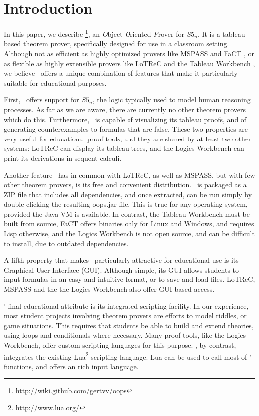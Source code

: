 \section{Introduction}
\label{sec:introduction}

In this paper, we describe \oops\footnote{http://wiki.github.com/gertvv/oops},
an {\it O}bject {\it O}riented {\it P}rover for $S5_n$.
It is a tableau-based theorem prover, specifically designed for use in a
classroom setting.
Although not as efficient as highly optimized provers like MSPASS
\citep{mspass2000} and FaCT \citep{fact1998}, or as flexible as highly
extensible provers like LoTReC \citep{lotrec2005} and the Tableau Workbench
\citep{twb2009}, we believe \oops\ offers a unique combination of features
that make it particularly suitable for educational purposes.

First, \oops\ offers support for $S5_n$, the logic typically used to model
human reasoning processes.
As far as we are aware, there are currently no other theorem provers which do
this.
Furthermore, \oops\ is capable of visualizing its tableau proofs, and of
generating counterexamples to formulas that are false.
These two properties are very useful for educational proof tools, and they are
shared by at least two other systems: LoTReC can display its tableau trees,
and the Logics Workbench \citep{heuerding1996} can print its derivations in
sequent calculi.

Another feature \oops\ has in common with LoTReC, as well as MSPASS, but with
few other theorem provers, is its free and convenient distribution.
\oops\ is packaged as a ZIP file that includes all dependencies, and once
extracted, can be run simply by double-clicking the resulting oops.jar file.
This is true for any operating system, provided the Java VM is available.
In contrast, the Tableau Workbench must be built from source,
FaCT offers binaries only for Linux and Windows, and requires
Lisp otherwise, and the Logics Workbench is not open source, and can be difficult to install, due to outdated dependencies.

A fifth property that makes \oops\ particularly attractive for educational use
is its Graphical User Interface (GUI).
Although simple, its GUI allows students to input formulas in an easy and
intuitive format, or to save and load files.  LoTReC, MSPASS and the the Logics Workbench also offer GUI-based access.

\oops' final educational attribute is its integrated scripting facility.
In our experience, most student projects involving theorem provers are efforts
to model riddles, or game situations.
This requires that students be able to build and extend theories, using loops
and conditionals where necessary.
Many proof tools, like the Logics Workbench, offer custom scripting languages
for this purpose.
\oops, by contrast, integrates the existing Lua\footnote{http://www.lua.org/}
scripting language.
Lua can be used to call most of \oops' functions, and offers an  rich input
language.

